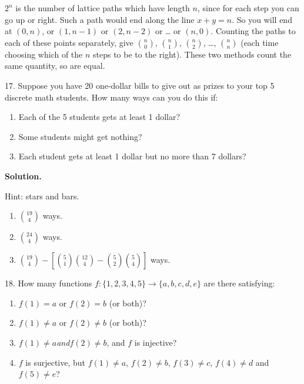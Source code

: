 \documentclass[10pt,]{book}
\theoremstyle{plain}
\theoremstyle{definition}
\theoremstyle{definition}
\theoremstyle{definition}
\numberwithin{equation}{section}
\begin{document}
\begin{exerciselist}
            \(2^n\) is the number of lattice paths which have length \(n\), since for each step you can go up or right. Such a path would end along the line \(x + y = n\). So you will end at \((0,n)\), or \((1,n-1)\) or \((2, n-2)\) or
            \dots{} or \((n,0)\). Counting the paths to each of these points separately, give \({n \choose 0}\), \({n \choose 1}\), \({n \choose 2}\),
            \dots{}, \({n \choose n}\) (each time choosing which of the \(n\) steps to be to the right).  These two methods count the same quantity, so are equal.
\item[17.]\hypertarget{exercise-118}{}
            Suppose you have 20 one-dollar bills to give out as prizes to your top 5 discrete math students. How many ways can you do this if:
          \leavevmode%
\begin{enumerate}[label=(\alph*)]
\item\hypertarget{li-747}{}
                Each of the 5 students gets at least 1 dollar?
\item\hypertarget{li-748}{}
                Some students might get nothing?
\item\hypertarget{li-749}{}
                Each student gets at least 1 dollar but no more than 7 dollars?
\end{enumerate}

\par\smallskip
\par\smallskip
\noindent\textbf{Solution.}\hypertarget{solution-169}{}\quad

            Hint: stars and bars.
          \leavevmode%
\begin{enumerate}[label=(\alph*)]
\item\hypertarget{li-750}{}\({19 \choose 4}\) ways.%
\item\hypertarget{li-751}{}\({24 \choose 4}\) ways.%
\item\hypertarget{li-752}{}\({19 \choose 4} - \left[{5 \choose 1}{12 \choose 4} - {5 \choose 2}{5 \choose 4}  \right]\) ways.%
\end{enumerate}

\item[18.]\hypertarget{exercise-119}{}
            How many functions \(f: \{1,2,3,4,5\} \to \{a,b,c,d,e\}\) are there satisfying:
          \leavevmode%
\begin{enumerate}[label=(\alph*)]
\item\hypertarget{li-753}{}\(f(1) = a\) or \(f(2) = b\) (or both)?%
\item\hypertarget{li-754}{}\(f(1) \ne a\) or \(f(2) \ne b\) (or both)?%
\item\hypertarget{li-755}{}\(f(1) \ne a\)\emph{and}\(f(2) \ne b\), and \(f\) is injective?%
\item\hypertarget{li-756}{}
                \(f\) is surjective, but \(f(1) \ne a\), \(f(2) \ne b\), \(f(3) \ne c\), \(f(4) \ne d\) and \(f(5) \ne e\)?
\end{enumerate}


\end{exerciselist}
\end{document}

